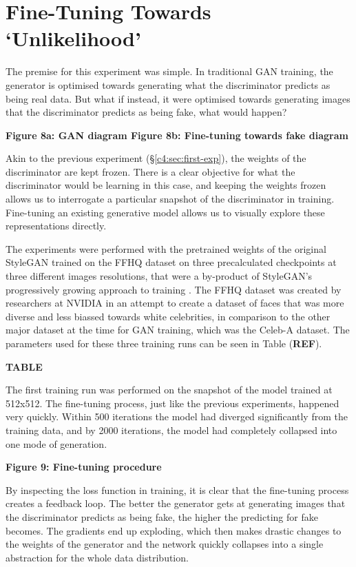 \section{Fine-Tuning Towards `Unlikelihood'}
\label{c4:sec:second-exp}

The premise for this experiment was simple. In traditional GAN training, the generator is optimised towards generating what the discriminator predicts as being real data. 
But what if instead, it were optimised towards generating images that the discriminator predicts as being fake, what would happen?

\textbf{Figure 8a: GAN diagram 
Figure 8b: Fine-tuning towards fake diagram}

Akin to the previous experiment (\S \ref{c4:sec:first-exp}), the weights of the discriminator are kept frozen. 
There is a clear objective for what the discriminator would be learning in this case, and keeping the weights frozen allows us to interrogate a particular snapshot of the discriminator in training. 
Fine-tuning an existing generative model allows us to visually explore these representations directly.

The experiments were performed with the pretrained weights of the original StyleGAN trained on the FFHQ dataset on three precalculated checkpoints at three different images resolutions, that were a by-product of StyleGAN's progressively growing approach to training \citep{karras2017progressive}.
The FFHQ dataset was created by researchers at NVIDIA in an attempt to create a dataset of faces that was more diverse and less biassed towards white celebrities, in comparison to the other major dataset at the time for GAN training, which was the Celeb-A dataset. 
The parameters used for these three training runs can be seen in Table (\textbf{REF}).

\textbf{TABLE}

The first training run was performed on the snapshot of the model trained at 512x512. 
The fine-tuning process, just like the previous experiments, happened very quickly. 
Within 500 iterations the model had diverged significantly from the training data, and by 2000 iterations, the model had completely collapsed into one mode of generation. 

\textbf{Figure 9: Fine-tuning procedure}

By inspecting the loss function in training, it is clear that the fine-tuning process creates a feedback loop. 
The better the generator gets at generating images that the discriminator predicts as being fake, the higher the predicting for fake becomes. 
The gradients end up exploding, which then makes drastic changes to the weights of the generator and the network quickly collapses into a single abstraction for the whole data distribution. 

